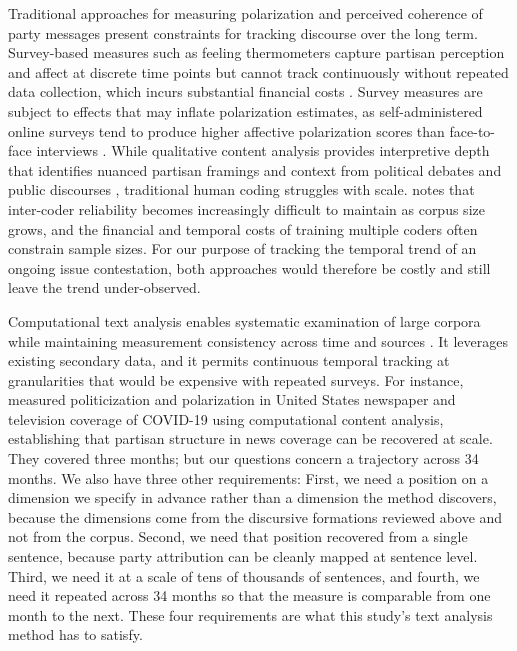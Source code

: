 Traditional approaches for measuring polarization and perceived coherence of party messages present constraints for tracking discourse over the long term. Survey-based measures such as feeling thermometers capture partisan perception and affect at discrete time points but cannot track continuously without repeated data collection, which incurs substantial financial costs \citep{iyengarOriginsConsequencesAffective2019,pewresearchcenterPoliticalPolarizationAmerican2014}. Survey measures are subject to effects that may inflate polarization estimates, as self-administered online surveys tend to produce higher affective polarization scores than face-to-face interviews \citep{thorntonImpactSurveyMode2025}. While qualitative content analysis provides interpretive depth that identifies nuanced partisan framings and context from political debates and public discourses \citep{krippendorffContentAnalysisIntroduction2019}, traditional human coding struggles with scale. \citet{krippendorffMeasuringReliabilityQualitative2004} notes that inter-coder reliability becomes increasingly difficult to maintain as corpus size grows, and the financial and temporal costs of training multiple coders often constrain sample sizes. For our purpose of tracking the temporal trend of an ongoing issue contestation, both approaches would therefore be costly and still leave the trend under-observed.

Computational text analysis enables systematic examination of large corpora while maintaining measurement consistency across time and sources \citep{grimmerTextDataNew2022}. It leverages existing secondary data, and it permits continuous temporal tracking at granularities that would be expensive with repeated surveys. For instance, \citet{hartPoliticizationPolarizationCOVID192020} measured politicization and polarization in United States newspaper and television coverage of COVID-19 using computational content analysis, establishing that partisan structure in news coverage can be recovered at scale. They covered three months; but our questions concern a trajectory across 34 months. We also have three other requirements: First, we need a position on a dimension we specify in advance rather than a dimension the method discovers, because the dimensions come from the discursive formations reviewed above and not from the corpus. Second, we need that position recovered from a single sentence, because party attribution can be cleanly mapped at sentence level. Third, we need it at a scale of tens of thousands of sentences, and fourth, we need it repeated across 34 months so that the measure is comparable from one month to the next. These four requirements are what this study's text analysis method has to satisfy.

